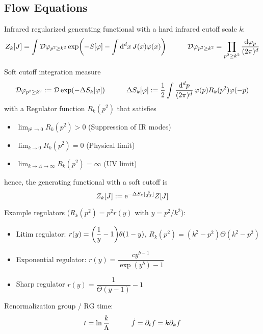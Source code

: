 	\subsection{Flow Equations}
		Infrared regularized generating functional with a hard infrared cutoff scale $k$:
		\begin{equation}
			Z_k[J] = \int \mathcal{D}\varphi_{p^2 \ge k^2} \exp(-S[\varphi] - \int \dd^d x \, J(x) \varphi(x))
			\hspace{30pt} \mathcal{D}\varphi_{p^2 \ge k^2} = \prod_{p^2 \ge k^2} \frac{\dd \varphi_p}{(2\pi)^d}
		\end{equation}

		\noindent
		Soft cutoff integration measure
		\begin{equation}
			\mathcal{D}\varphi_{p^2 \ge k^2} := \mathcal{D} \exp(-\Delta S_k[\varphi])
			\hspace{30pt} \Delta S_k[\varphi] := \frac{1}{2} \int \frac{\dd^d p}{(2\pi)^d}\, \varphi(p)R_k(p^2) \varphi(-p)
		\end{equation}
		with a Regulator function $R_k(p^2)$ that satisfies
		\begin{itemize}\itemsep -0pt
			\item $\displaystyle\lim_{p^2 \to 0} R_k(p^2) > 0$ \hfill{(Suppression of IR modes)}
			\item $\displaystyle\lim_{k \to 0} R_k(p^2) = 0$ \hfill{(Physical limit)}
			\item $\displaystyle\lim_{k \to \Lambda \to \infty} R_k(p^2) = \infty$ \hfill{(UV limit)}
		\end{itemize}
		hence, the generating functional with a soft cutoff is
		\begin{equation}
			Z_k[J] := \ex^{-\Delta S_k [\fdv{J}]}Z[J]
		\end{equation}

		\noindent
		Example regulators ($R_k(p^2) = p^2 r(y)$ with $y=p^2/k^2$):
		\begin{itemize} \itemsep -0pt
			\item Litim regulator: $r(y) = \qty(\dfrac{1}{y}-1)\theta(1-y)$, \ie $R_k(p^2) = (k^2 - p^2) \Theta(k^2 - p^2)$ \\
			\item Exponential regulator: $r(y) = \dfrac{cy^{b-1}}{\exp(y^b) - 1}$ \\
			\item Sharp regulator $r(y) = \dfrac{1}{\Theta(y-1)}-1$
		\end{itemize}

		\noindent
		Renormalization group / RG time:
		\begin{equation}
			t = \ln \frac{k}{\Lambda}
			\hspace{30pt} \dot{f} = \partial_t f = k \partial_k f
		\end{equation}

